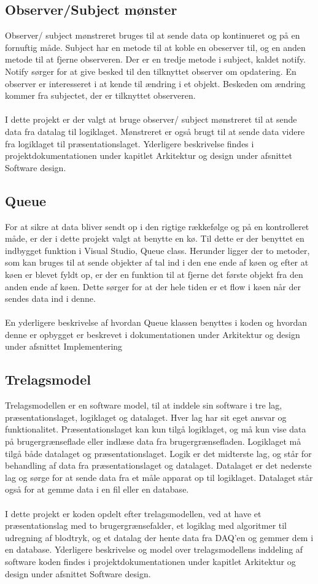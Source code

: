 \subsection{Observer/Subject mønster}
Observer/ subject mønstreret bruges til at sende data op kontinueret og på en fornuftig måde. Subject har en metode til at koble en obeserver til, og en anden metode til at fjerne observeren. Der er en tredje metode i subject, kaldet notify. Notify sørger for at give besked til den tilknyttet observer om opdatering. En observer er interesseret i at kende til ændring i et objekt. Beskeden om ændring kommer fra subjectet, der er tilknyttet observeren. \\
\\
I dette projekt er der valgt at bruge observer/ subject mønstreret til at sende data fra datalag til logiklaget. Mønstreret er også brugt til at sende data videre fra logiklaget til præsentationslaget. Yderligere beskrivelse findes i projektdokumentationen under kapitlet Arkitektur og design under afsnittet Software design. 
\subsection{Queue}
For at sikre at data bliver sendt op i den rigtige rækkefølge og på en kontrolleret måde, er der i dette projekt valgt at benytte en kø. Til dette er der benyttet en indbygget funktion i Visual Studio, Queue class. Herunder ligger der to metoder, som kan bruges til at sende objekter af tal ind i den ene ende af køen og efter at køen er blevet fyldt op, er der en funktion til at fjerne det første objekt fra den anden ende af køen. Dette sørger for at der hele tiden er et flow i køen når der sendes data ind i denne. \\
\\
En yderligere beskrivelse af hvordan Queue klassen benyttes i koden og hvordan denne er opbygget er beskrevet i dokumentationen under Arkitektur og design under afsnittet Implementering
\subsection{Trelagsmodel}
Trelagsmodellen er en software model, til at inddele sin software i tre lag, præsentationslaget, logiklaget og datalaget. Hver lag har sit eget ansvar og funktionalitet. Præsentationslaget kan kun tilgå logiklaget, og må kun vise data på brugergrænseflade eller indlæse data fra brugergrænsefladen. Logiklaget må tilgå både datalaget og præsentationslaget. Logik er det midterste lag, og står for behandling af data fra præsentationslaget og datalaget. Datalaget er det nederste lag og sørge for at sende data fra et måle apparat op til logiklaget. Datalaget står også for at gemme data i en fil eller en database.\\
\\ 
I dette projekt er koden opdelt efter trelagsmodellen, ved at have et præsentationslag med to brugergrænsefalder, et logiklag med algoritmer til udregning af blodtryk, og et datalag der hente data fra DAQ’en og gemmer dem i en database.  Yderligere beskrivelse og model over trelagsmodellens inddeling af software koden findes i projektdokumentationen under kapitlet Arkitektur og design under afsnittet Software design. 

